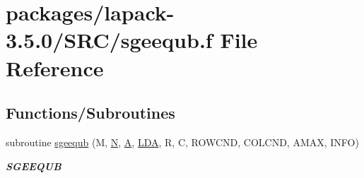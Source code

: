 \hypertarget{sgeequb_8f}{}\section{packages/lapack-\/3.5.0/\+S\+R\+C/sgeequb.f File Reference}
\label{sgeequb_8f}
\subsection*{Functions/\+Subroutines}
\begin{DoxyCompactItemize}
\item 
subroutine \hyperlink{group__realGEcomputational_gaf05e763f3d07240f35350dd583ecf4f2}{sgeequb} (M, \hyperlink{polmisc_8c_a0240ac851181b84ac374872dc5434ee4}{N}, \hyperlink{classA}{A}, \hyperlink{example__user_8c_ae946da542ce0db94dced19b2ecefd1aa}{L\+D\+A}, R, C, R\+O\+W\+C\+N\+D, C\+O\+L\+C\+N\+D, A\+M\+A\+X, I\+N\+F\+O)
\begin{DoxyCompactList}\small\item\em {\bfseries S\+G\+E\+E\+Q\+U\+B} \end{DoxyCompactList}\end{DoxyCompactItemize}
